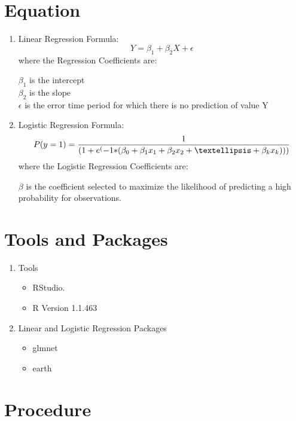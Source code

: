 \documentclass[a4paper,10pt]{article}
\begin{document}
\section{Equation} 
\begin{enumerate}
   \item Linear Regression Formula:
   \begin{equation}
   Y = \beta_1 + \beta_2X +  \epsilon
   \end{equation}
   where the Regression Coefficients are: 
   
   $\beta_1$ is the intercept \\
   $\beta_2$ is the slope \\
   $\epsilon$ is the error time period for which there is no prediction of value Y
  
  \item Logistic Regression Formula:
  \begin{equation}
  	P(y = 1) = \frac{1} {(1+ e^({-1*}( \beta_0 + \beta_1x_1 +\beta_2x_2 +\textellipsis + \beta_kx_k)))}
  \end{equation}
  where the Logistic Regression Coefficients are:
  
  $\beta$ is the coefficient selected to maximize the likelihood of predicting a high probability for observations.
\end{enumerate}

\section{Tools and Packages}
\begin{enumerate}
	\item Tools
	\begin{itemize}
		\item RStudio.
		\item R Version 1.1.463
	\end{itemize}
	\item Linear and Logistic Regression Packages
	\begin{itemize}
		\item glmnet
		\item earth
	\end{itemize}				
\end{enumerate}

\section{Procedure}
\end{document}
